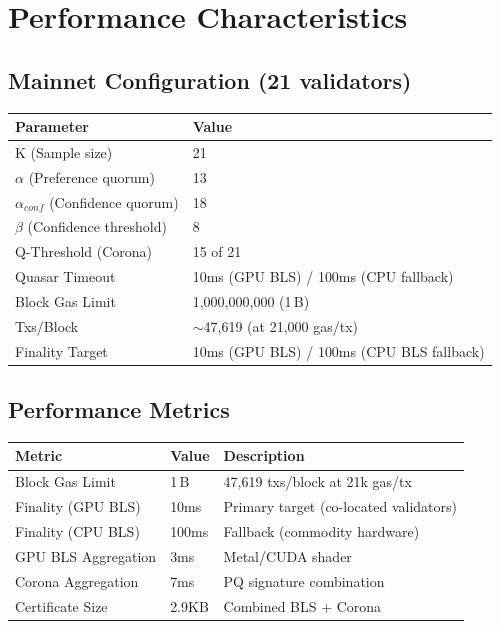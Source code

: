 \section{Performance Characteristics}


\subsection{Mainnet Configuration (21 validators)}

\begin{table}[h]
\centering
\begin{tabular}{@{}ll@{}}
\toprule
\textbf{Parameter} & \textbf{Value} \\
\midrule
K (Sample size) & 21 \\
$\alpha$ (Preference quorum) & 13 \\
$\alpha_{conf}$ (Confidence quorum) & 18 \\
$\beta$ (Confidence threshold) & 8 \\
Q-Threshold (Corona) & 15 of 21 \\
Quasar Timeout & 10ms (GPU BLS) / 100ms (CPU fallback) \\
Block Gas Limit & 1{,}000{,}000{,}000 (1\,B) \\
Txs/Block & $\sim$47{,}619 (at 21{,}000 gas/tx) \\
Finality Target & 10ms (GPU BLS) / 100ms (CPU BLS fallback) \\
\bottomrule
\end{tabular}

\label{tab:mainnet-params}
\end{table}

\subsection{Performance Metrics}

\begin{table}[h]
\centering
\begin{tabular}{@{}lll@{}}
\toprule
\textbf{Metric} & \textbf{Value} & \textbf{Description} \\
\midrule
Block Gas Limit & 1\,B & 47{,}619 txs/block at 21k gas/tx \\
Finality (GPU BLS) & 10ms & Primary target (co-located validators) \\
Finality (CPU BLS) & 100ms & Fallback (commodity hardware) \\
GPU BLS Aggregation & 3ms & Metal/CUDA shader \\
Corona Aggregation & 7ms & PQ signature combination \\
Certificate Size & 2.9KB & Combined BLS + Corona \\
\bottomrule
\end{tabular}

\label{tab:performance}
\end{table}

